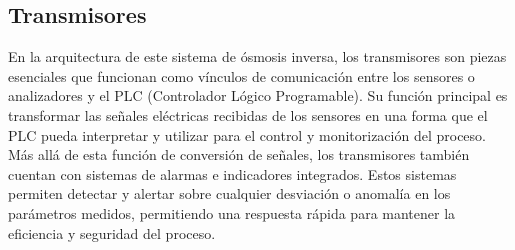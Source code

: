 
\subsection{Transmisores}

En la arquitectura de este sistema de ósmosis inversa, los transmisores son piezas esenciales que funcionan como vínculos de
comunicación entre los sensores o analizadores y el PLC (Controlador Lógico Programable).
Su función principal es transformar las señales eléctricas recibidas de los sensores en una forma que el
PLC pueda interpretar y utilizar para el control y monitorización del proceso. \\

Más allá de esta función de conversión de señales, los transmisores también cuentan con sistemas de alarmas e indicadores
integrados. Estos sistemas permiten detectar y alertar sobre cualquier desviación o
anomalía en los parámetros medidos, permitiendo una respuesta rápida para mantener la eficiencia y seguridad del proceso. \\


